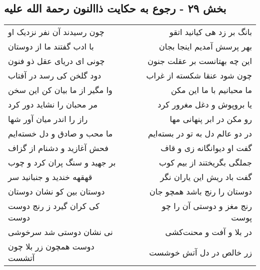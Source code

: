 \begin{center}
\section*{بخش ۲۹ - رجوع به حکایت ذاالنون رحمة الله علیه}
\label{sec:sh029}
\begin{longtable}{l p{0.5cm} r}
چون رسیدند آن نفر نزدیک او
&&
بانگ بر زد هی کیانید اتقو
\\
با ادب گفتند ما از دوستان
&&
بهر پرسش آمدیم اینجا بجان
\\
چونی ای دریای عقل ذو فنون
&&
این چه بهتانست بر عقلت جنون
\\
دود گلخن کی رسد در آفتاب
&&
چون شود عنقا شکسته از غراب
\\
وا مگیر از ما بیان کن این سخن
&&
ما محبانیم با ما این مکن
\\
مر محبان را نشاید دور کرد
&&
یا بروپوش و دغل مغرور کرد
\\
راز را اندر میان آور شها
&&
رو مکن در ابر پنهانی مها
\\
ما محب و صادق و دل خسته‌ایم
&&
در دو عالم دل به تو در بسته‌ایم
\\
فحش آغازید و دشنام از گزاف
&&
گفت او دیوانگانه زی و قاف
\\
بر جهید و سنگ پران کرد و چوب
&&
جملگی بگریختند از بیم کوب
\\
قهقهه خندید و جنبانید سر
&&
گفت باد ریش این یاران نگر
\\
دوستان بین کو نشان دوستان
&&
دوستان را رنج باشد همچو جان
\\
کی کران گیرد ز رنج دوست دوست
&&
رنج مغز و دوستی آن را چو پوست
\\
نی نشان دوستی شد سرخوشی
&&
در بلا و آفت و محنت‌کشی
\\
دوست همچون زر بلا چون آتشست
&&
زر خالص در دل آتش خوشست
\\
\end{longtable}
\end{center}

